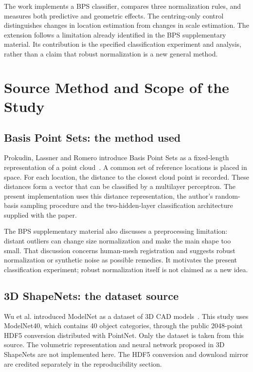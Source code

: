 \documentclass[11pt,a4paper]{article}
\begin{document}
The work implements a BPS classifier, compares three normalization rules, and measures both predictive and geometric effects. The centring-only control distinguishes changes in location estimation from changes in scale estimation. The extension follows a limitation already identified in the BPS supplementary material. Its contribution is the specified classification experiment and analysis, rather than a claim that robust normalization is a new general method.
\clearpage

\section{Source Method and Scope of the Study}
\subsection{Basis Point Sets: the method used}
Prokudin, Lassner and Romero introduce Basis Point Sets as a fixed-length representation of a point cloud~\cite{bps}. A common set of reference locations is placed in space. For each location, the distance to the closest cloud point is recorded. These distances form a vector that can be classified by a multilayer perceptron. The present implementation uses this distance representation, the author's random-basis sampling procedure and the two-hidden-layer classification architecture supplied with the paper.

The BPS supplementary material also discusses a preprocessing limitation: distant outliers can change size normalization and make the main shape too small. That discussion concerns human-mesh registration and suggests robust normalization or synthetic noise as possible remedies. It motivates the present classification experiment; robust normalization itself is not claimed as a new idea.

\subsection{3D ShapeNets: the dataset source}
Wu et al. introduced ModelNet as a dataset of 3D CAD models~\cite{shapenets}. This study uses ModelNet40, which contains 40 object categories, through the public 2048-point HDF5 conversion distributed with PointNet. Only the dataset is taken from this source. The volumetric representation and neural network proposed in 3D ShapeNets are not implemented here. The HDF5 conversion and download mirror are credited separately in the reproducibility section.
\end{document}
